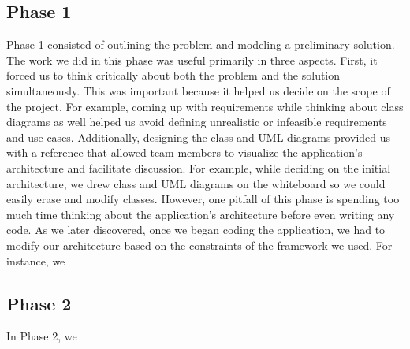 \documentclass[letterpaper, 12pt]{article}
\begin{document}
\subsection{Phase 1}
Phase 1 consisted of outlining the problem and modeling a preliminary solution.  The work we did in this phase was useful primarily in three aspects. First, it forced us to think critically about both the problem and the solution simultaneously.  This was important because it helped us decide on the scope of the project.  For example, coming up with requirements while thinking about class diagrams as well helped us avoid defining unrealistic or infeasible requirements and use cases.  Additionally, designing the class and UML diagrams provided us with a reference that allowed team members to visualize the application's architecture and facilitate discussion. For example, while deciding on the initial architecture, we drew class and UML diagrams on the whiteboard so we could easily erase and modify classes.  However, one pitfall of this phase is spending too much time thinking about the application's architecture before even writing any code.  As we later discovered, once we began coding the application, we had to modify our architecture based on the constraints of the framework we used. For instance, we 

\subsection{Phase 2}
In Phase 2, we 
\end{document}
